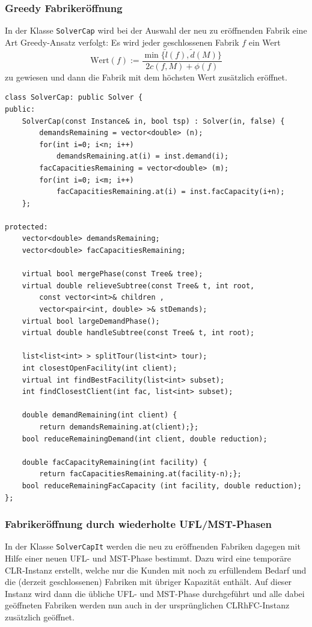 \documentclass[a4paper,ngerman,11pt,bibtotoc]{scrartcl}
\theoremstyle{definition}
\theoremstyle{plain}
\theoremstyle{remark}
\newcommand{\CLR}{CLR}
\newcommand{\CLRHFC}{CLRhFC}
\newcommand{\MST}{MST}
\newcommand{\UFL}{UFL}
\begin{document}
	\subsubsection{Greedy Fabrikeröffnung}
	
	In der Klasse \lstinline|SolverCap| wird bei der Auswahl der neu zu eröffnenden Fabrik eine Art Greedy-Ansatz verfolgt: Es wird jeder geschlossenen Fabrik $f$ ein Wert
	\[\text{Wert}(f) :=  \frac{\min\{\tilde{l}(f), \tilde{d}(M)\}}{2 c(f,M) + \phi(f)}\]
	zu gewiesen und dann die Fabrik mit dem höchsten Wert zusätzlich eröffnet.
	
\begin{lstlisting}[caption=Die Klasse SolverCap]
class SolverCap: public Solver {
public:
	SolverCap(const Instance& in, bool tsp) : Solver(in, false) {
		demandsRemaining = vector<double> (n);
		for(int i=0; i<n; i++) 
			demandsRemaining.at(i) = inst.demand(i);
		facCapacitiesRemaining = vector<double> (m);
		for(int i=0; i<m; i++) 
			facCapacitiesRemaining.at(i) = inst.facCapacity(i+n);
	};

protected:
	vector<double> demandsRemaining;
	vector<double> facCapacitiesRemaining;

	virtual bool mergePhase(const Tree& tree);
	virtual double relieveSubtree(const Tree& t, int root, 
		const vector<int>& children , 
		vector<pair<int, double> >& stDemands);
	virtual bool largeDemandPhase();
	virtual double handleSubtree(const Tree& t, int root);

	list<list<int> > splitTour(list<int> tour);
	int closestOpenFacility(int client);
	virtual int findBestFacility(list<int> subset);
	int findClosestClient(int fac, list<int> subset);

	double demandRemaining(int client) {
		return demandsRemaining.at(client);};
	bool reduceRemainingDemand(int client, double reduction);

	double facCapacityRemaining(int facility) {
		return facCapacitiesRemaining.at(facility-n);};
	bool reduceRemainingFacCapacity (int facility, double reduction);
};
\end{lstlisting}
	
	\subsubsection{Fabrikeröffnung durch wiederholte \UFL/\MST-Phasen}
	
	In der Klasse \lstinline|SolverCapIt| werden die neu zu eröffnenden Fabriken dagegen mit Hilfe einer neuen \UFL- und \MST-Phase bestimmt. Dazu wird eine temporäre \CLR-Instanz erstellt, welche nur die Kunden mit noch zu erfüllendem Bedarf und die (derzeit geschlossenen) Fabriken mit übriger Kapazität enthält. Auf dieser Instanz wird dann die übliche \UFL- und \MST-Phase durchgeführt und alle dabei geöffneten Fabriken werden nun auch in der ursprünglichen \CLRHFC-Instanz zusätzlich geöffnet. 
	
\end{document}
